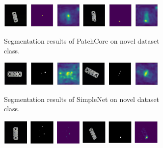 
\begin{figure}[htbp]
    \centering
    \captionsetup[subfigure]{justification=centering}
    \begin{subfigure}[b]{\textwidth}
        \includegraphics[width=0.45\textwidth]{figures/allapproachesFCimages/patchcore_flat_connector_test_logical_anomalies_023.png}
        \includegraphics[width=0.45\textwidth]{figures/allapproachesFCimages/patchcore_flat_connector_test_structural_anomalies_014.png}
        \caption{Segmentation results of PatchCore \cite{patchCore2022} on novel dataset class.}
    \end{subfigure}
    \hfill
    \begin{subfigure}[b]{\textwidth}
        \includegraphics[width=0.45\textwidth]{figures/allapproachesFCimages/simplenet_flat_connector_test_logical_anomalies_004.png}
        \includegraphics[width=0.45\textwidth]{figures/allapproachesFCimages/simplenet_flat_connector_test_structural_anomalies_016.png}
        \caption{Segmentation results of SimpleNet \cite{liu2023simplenet} on novel dataset class.}
    \end{subfigure}
    \hfill
    \begin{subfigure}[b]{\textwidth}
        \includegraphics[width=0.45\textwidth]{figures/allapproachesFCimages/DRAEM_structural_26.png}
        \includegraphics[width=0.45\textwidth]{figures/allapproachesFCimages/DRAEM_logical_image_40.png}

\end{subfigure}
\end{figure}
